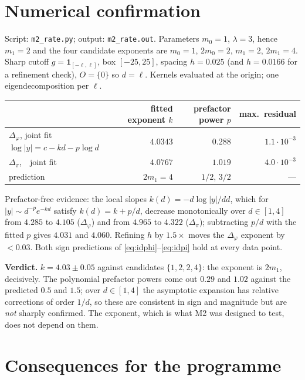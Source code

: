 \documentclass[11pt,a4paper]{article}
\theoremstyle{plain}
\theoremstyle{definition}
\begin{document}
\section{Numerical confirmation}\label{sec:num}

Script: \texttt{m2\_rate.py}; output: \texttt{m2\_rate.out}. Parameters $m_0=1$, $\lambda=3$, hence
$m_1=2$ and the four candidate exponents are $m_0=1$, $2m_0=2$, $m_1=2$, $2m_1=4$. Sharp cutoff
$g=\mathbf 1_{[-\ell,\ell]}$, box $[-25,25]$, spacing $h=0.025$ (and $h=0.0166$ for a refinement
check), $O=\{0\}$ so $d=\ell$. Kernels evaluated at the origin; one eigendecomposition per $\ell$.

\begin{center}
\begin{tabular}{lrrr}
\toprule
 & fitted exponent $k$ & prefactor power $p$ & max.\ residual\\
\midrule
$\Delta_\varphi$, joint fit $\log|y|=c-kd-p\log d$ & $4.0343$ & $0.288$ & $1.1\cdot10^{-3}$\\
$\Delta_\pi$,\ \ joint fit                          & $4.0767$ & $1.019$ & $4.0\cdot10^{-3}$\\
\midrule
prediction & $2m_1=4$ & $1/2$, $3/2$ & ---\\
\bottomrule
\end{tabular}
\end{center}

Prefactor-free evidence: the local slopes $k(d)=-d\log|y|/dd$, which for
$|y|\sim d^{-p}e^{-kd}$ satisfy $k(d)=k+p/d$, decrease monotonically over $d\in[1,4]$ from
$4.285$ to $4.105$ ($\Delta_\varphi$) and from $4.965$ to $4.322$ ($\Delta_\pi$); subtracting
$p/d$ with the fitted $p$ gives $4.031$ and $4.060$. Refining $h$ by $1.5\times$ moves the
$\Delta_\varphi$ exponent by $<0.03$. Both sign predictions of \eqref{eq:idphi}--\eqref{eq:idpi}
hold at every data point.

\medskip
\noindent\textbf{Verdict.} $k=4.03\pm0.05$ against candidates $\{1,2,2,4\}$: the exponent is
$2m_1$, decisively. The polynomial prefactor powers come out $0.29$ and $1.02$ against the
predicted $0.5$ and $1.5$; over $d\in[1,4]$ the asymptotic expansion has relative corrections of
order $1/d$, so these are consistent in sign and magnitude but are \emph{not} sharply confirmed.
The exponent, which is what M2 was designed to test, does not depend on them.

\section{Consequences for the programme}
\end{document}
